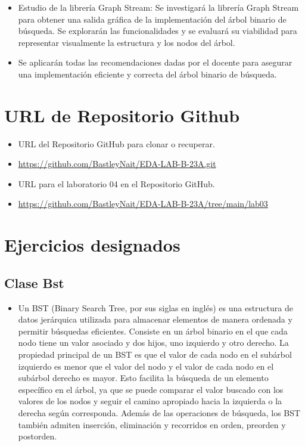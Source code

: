 \documentclass{article}
\begin{document}
\begin{itemize}
		\item Estudio de la librería Graph Stream: Se investigará la librería Graph Stream para obtener una salida gráfica de la implementación del árbol binario de búsqueda. Se explorarán las funcionalidades y se evaluará su viabilidad para representar visualmente la estructura y los nodos del árbol.
		\item Se aplicarán todas las recomendaciones dadas por el docente para asegurar una implementación eficiente y correcta del árbol binario de búsqueda.
	\end{itemize}
		

	\section{URL de Repositorio Github}
	\begin{itemize}
		\item URL del Repositorio GitHub para clonar o recuperar.
		\item \url{https://github.com/BastleyNait/EDA-LAB-B-23A.git}
		\item URL para el laboratorio 04 en el Repositorio GitHub.
		\item \url{https://github.com/BastleyNait/EDA-LAB-B-23A/tree/main/lab03}
	\end{itemize}
	
	\section{Ejercicios designados}

	\subsection{Clase Bst}
	\begin{itemize}	
		\item  
		Un BST (Binary Search Tree, por sus siglas en inglés) es una estructura de datos jerárquica utilizada para almacenar elementos de manera ordenada y permitir búsquedas eficientes. Consiste en un árbol binario en el que cada nodo tiene un valor asociado y dos hijos, uno izquierdo y otro derecho. La propiedad principal de un BST es que el valor de cada nodo en el subárbol izquierdo es menor que el valor del nodo y el valor de cada nodo en el subárbol derecho es mayor. Esto facilita la búsqueda de un elemento específico en el árbol, ya que se puede comparar el valor buscado con los valores de los nodos y seguir el camino apropiado hacia la izquierda o la derecha según corresponda. Además de las operaciones de búsqueda, los BST también admiten inserción, eliminación y recorridos en orden, preorden y postorden.
	\end{itemize}	
	
\end{document}
